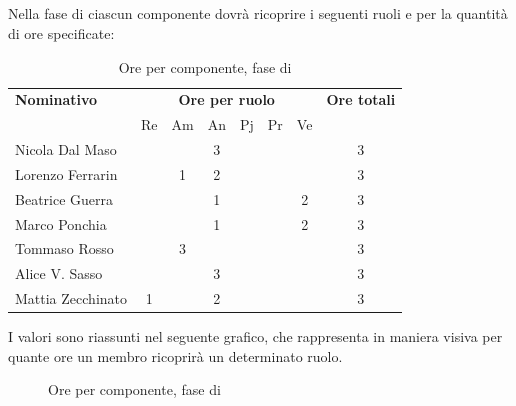 \subsection{\AD}
Nella fase di \AD ciascun componente dovrà ricoprire i seguenti ruoli e per la quantità di ore specificate:

\begin{table}[H]
	\centering
	\begin{tabular}{|l|c|c|c|c|c|c|c|}
		\hline
		\textbf{Nominativo} & 
		\multicolumn{6}{c|}{\textbf{Ore per ruolo}} & 
		\textbf{Ore totali} \\
		& Re & Am & An & Pj & Pr & Ve & \\
		\hline
		Nicola Dal Maso & & & 3 & & &  & 3 \\
		Lorenzo Ferrarin & & 1 & 2 & & &  & 3 \\
		Beatrice Guerra & & & 1 & & & 2 & 3 \\
		Marco Ponchia & & & 1 & & & 2 & 3 \\
		Tommaso Rosso & & 3 & & & & & 3 \\
		Alice V. Sasso & & & 3 & & & & 3 \\
		Mattia Zecchinato & 1 & & 2 & & & & 3 \\
		\hline
	\end{tabular}
	\caption{Ore per componente, fase di \AD}
\end{table}
I valori sono riassunti nel seguente grafico, che rappresenta in maniera visiva per quante ore un membro ricoprirà un determinato ruolo.
\begin{figure}[H]
	\centering
	\caption{Ore per componente, fase di \AD}
\end{figure}


